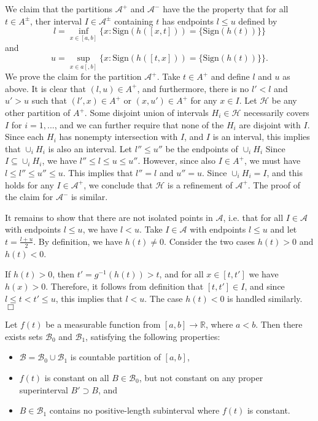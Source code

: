 We claim that the partitions $\mathcal{A}^+$ and $\mathcal{A}^-$ have
the the property that for all $t \in A^\pm$, ther interval
$I \in \mathcal{A}^\pm$ containing $t$ has endpoints $l \leq u$
defined by
\[
l = \inf_{x \in [a,b]} \{x: \text{Sign}(h([x, t])) = \{\text{Sign}(h(t))\} \}
\]
and
\[
u = \sup_{x \in a[,b]} \{x: \text{Sign}(h([t, x])) = \{\text{Sign}(h(t))\}\}.
\]
We prove the claim for the partition $\mathcal{A}^+$.  Take $t \in
A^+$ and define $l$ and $u$ as above.  It is clear that $(l, u) \in
A^+$, and furthermore, there is no $l' < l$ and $u' > u$ such that
$(l', x) \in A^+$ or $(x, u') \in A^+$ for any $x \in I$.  Let
$\mathcal{H}$ be any other partition of $A^+$.  Some disjoint union of
intervals $H_i \in \mathcal{H}$ necessarily covers $I$ for $i =
1,...$, and we can further require that none of the $H_i$ are disjoint
with $I$.  Since each $H_i$ has nonempty intersection with $I$, and
$I$ is an interval, this implies that $\cup_i H_i$ is also an
interval.  Let $l'' \leq u''$ be the endpoints of $\cup_i H_i$ Since
$I \subseteq \cup_i H_i$, we have $l'' \leq l \leq u \leq u''$.
However, since also $I \in A^+$, we must have $l \leq l'' \leq
u'' \leq u$.  This implies that $l''=l$ and $u''=u$.  Since $\cup_i
H_i = I$, and this holds for any $I \in \mathcal{A}^+$, we conclude
that $\mathcal{H}$ is a refinement of $\mathcal{A}^+$. The proof of
the claim for $\mathcal{A}^-$ is similar.

It remains to show that there are not isolated points in
$\mathcal{A}$, i.e. that for all $I \in \mathcal{A}$ with endpoints
$l \leq u$, we have $l < u$.  Take $I \in \mathcal{A}$ with endpoints
$l \leq u$ and let $t = \frac{l+u}{2}$.  By definition, we have
$h(t) \neq 0$.  Consider the two cases $h(t) > 0$ and $h(t) < 0$.

If $h(t) > 0$, then $t' = g^{-1}(h(t)) > t$, and for all $x \in [t,
t']$ we have $h(x) > 0$.  Therefore, it follows from definition that
$[t, t'] \in I$, and since $l \leq t < t' \leq u$, this implies that
$l < u$.  The case $h(t) < 0$ is handled similarly. $\Box$

\begin{lemma}\label{lemma:technical2}
Let $f(t)$ be a measurable function from $[a,b] \to \mathbb{R}$, where $a < b.$
Then there exists sets $\mathcal{B}_0$ and $\mathcal{B}_1$, satisfying the following properties:
\begin{itemize}
\item  $\mathcal{B} = \mathcal{B}_0 \cup \mathcal{B}_1$ is countable partition of $[a,b]$,
\item  $f(t)$ is constant on all $B \in \mathcal{B}_0$, but not constant on any proper superinterval $B' \supset B$, and
\item $B \in \mathcal{B}_1$ contains no positive-length subinterval where $f(t)$ is constant.
\end{itemize}
\end{lemma}

